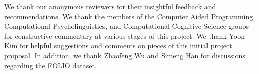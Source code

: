 \documentclass[11pt]{article}
\begin{document}
We thank our anonymous reviewers for their insightful feedback and recommendations.
We thank the members of the Computer Aided Programming, Computational Psycholinguistics, and Computational Cognitive Science groups for constructive commentary at various stages of this project. 
We thank Yoon Kim for helpful suggestions and comments on pieces of this initial project proposal.
In addition, we thank Zhaofeng Wu and Simeng Han for discussions regarding the FOLIO dataset.




\appendix

\end{document}

